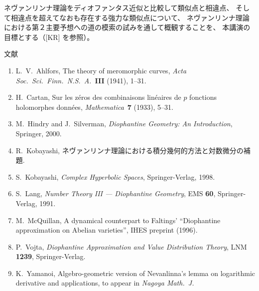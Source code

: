 \documentclass[uplatex,dvipdfmx]{jlreq}
\begin{document}
\medskip

ネヴァンリンナ理論をディオファンタス近似と比較して類似点と相違点、
そして相違点を超えてなおも存在する強力な類似点について、
ネヴァンリンナ理論における第２主要予想への道の模索の試みを通して概観することを、
本講演の目標とする（[KR] を参照）。

\vspace{1pc}

\begin{center}
  \textsc{文献}
\end{center}
\begin{enumerate}
  \item[{[A]}] L.~V.~Ahlfors,
        The theory of meromorphic curves,
        \textit{Acta Soc.~Sci.~Finn.~N.S.~A.}~\textbf{III} (1941), 1--31.
  \item[{[C]}] H.~Cartan,
        Sur les zéros des combinaisons linéaires de $p$ fonctions holomorphes données,
        \textit{Mathematica}~\textbf{7} (1933), 5--31.
  \item[{[HS]}] M.~Hindry and J.~Silverman,
        \textit{Diophantine Geometry: An Introduction},
        Springer, 2000.
  \item[{[KR]}] R.~Kobayashi,
        ネヴァンリンナ理論における積分幾何的方法と対数微分の補題.
  \item[{[KS]}] S.~Kobayashi,
        \textit{Complex Hyperbolic Spaces},
        Springer-Verlag, 1998.
  \item[{[L]}] S.~Lang,
        \textit{Number Theory III --- Diophantine Geometry},
        EMS \textbf{60},
        Springer-Verlag, 1991.
  \item[{[M]}] M.~McQuillan,
        A dynamical counterpart to Faltings' ``Diophantine approximation
        on Abelian varieties'',
        IHES preprint (1996).
  \item[{[V]}] P.~Vojta,
        \textit{Diophantine Approximation and Value Distribution Theory},
        LNM \textbf{1239},
        Springer-Verlag.
  \item[{[Y]}] K.~Yamanoi,
        Algebro-geometric version of Nevanlinna's lemma on logarithmic
        derivative and applications,
        to appear in \textit{Nagoya Math.~J.}
\end{enumerate}
\end{document}
